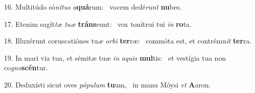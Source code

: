 16. Multitúdo só\textit{ni}\textit{tus} \textit{a}\textbf{quá}rum: \ast\  vocem dedé\textit{runt} \textbf{nu}bes.\

17. Etenim sagít\textit{tæ} \textit{tu}\textit{æ} \textbf{tráns}eunt: \ast\  vox tonítrui tui \textit{in} \textbf{ro}ta.\

18. Illuxérunt coruscatiónes tu\textit{æ} \textit{or}\textit{bi} \textbf{ter}ræ: \ast\  commóta est, et contrému\textit{it} \textbf{ter}ra.\

19. In mari via tua, et sémitæ tuæ \textit{in} \textit{a}\textit{quis} \textbf{mul}tis: \ast\  et vestígia tua non co\textit{gno}\textbf{scén}tur.\

20. Deduxísti sicut oves \textit{pó}\textit{pu}\textit{lum} \textbf{tu}um, \ast\  in manu Móysi \textit{et} \textbf{A}aron.\

